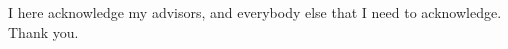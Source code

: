\begin{thesisacknowledgments}	
I here acknowledge my advisors, and everybody else that I need to acknowledge. Thank you.
\end{thesisacknowledgments} 